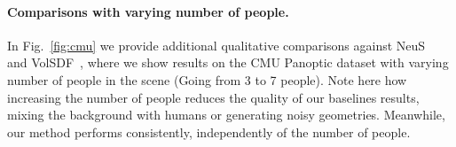 \paragraph{Comparisons with varying number of people.} In Fig.~\ref{fig:cmu} we provide additional qualitative comparisons against NeuS~\cite{wang2021neus} and VolSDF~\cite{yariv2021volume}, where we show results on the CMU Panoptic dataset \cite{Simon_2017_CVPR,Joo_2017_TPAMI} with varying number of people in the scene  (Going from 3 to 7 people). Note here how increasing the number of people reduces the quality of our baselines results, \ie mixing the background with humans or generating noisy geometries. Meanwhile, our method performs consistently, independently of the number of people.




